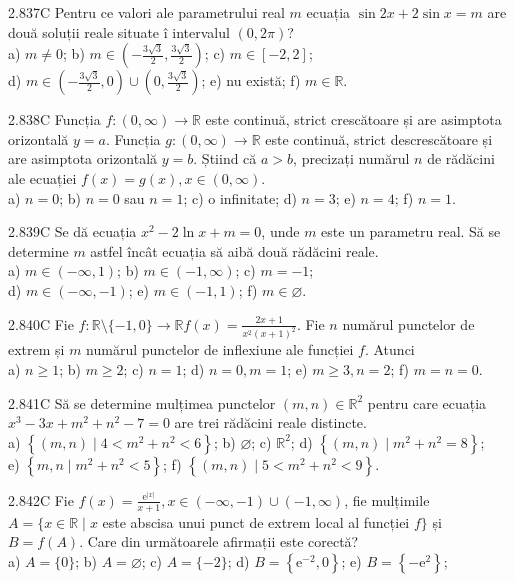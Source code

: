 \documentclass[11pt]{article}
\begin{document}
2.837C Pentru ce valori ale parametrului real $m$ ecuația $\sin 2 x+2 \sin x=m$ are două soluții reale situate î intervalul $(0,2 \pi)$?\\ a) $m \neq 0$; b) $m \in\left(-\frac{3 \sqrt{3}}{2}, \frac{3 \sqrt{3}}{2}\right)$; c) $m \in[-2,2]$;\\ d) $m \in\left(-\frac{3 \sqrt{3}}{2}, 0\right) \cup\left(0, \frac{3 \sqrt{3}}{2}\right)$; e) nu există; f) $m \in \mathbb{R}$.

2.838C Funcția $f:(0, \infty) \rightarrow \mathbb{R}$ este continuă, strict crescătoare și are asimptota orizontală $y=a$. Funcția $g:(0, \infty) \rightarrow \mathbb{R}$ este continuă, strict descrescătoare și are asimptota orizontală $y=b$. Știind că $a>b$, precizați numărul $n$ de rădăcini ale ecuației $f(x)=g(x), x \in(0, \infty)$.\\ a) $n=0$; b) $n=0$ sau $n=1$; c) o infinitate; d) $n=3$; e) $n=4$; f) $n=1$.

2.839C Se dă ecuația $x^{2}-2 \ln x+m=0$, unde $m$ este un parametru real. Să se determine $m$ astfel încât ecuația să aibă două rădăcini reale.\\ a) $m \in(-\infty, 1)$; b) $m \in(-1, \infty)$; c) $m=-1$;\\ d) $m \in(-\infty,-1)$; e) $m \in(-1,1)$; f) $m \in \varnothing$.

2.840C Fie $f: \mathbb{R} \setminus\{-1,0\} \rightarrow \mathbb{R} f(x)=\frac{2 x+1}{x^{2}(x+1)^{2}}$. Fie $n$ numărul punctelor de extrem și $m$ numărul punctelor de inflexiune ale funcției $f$. Atunci\\ a) $n \geq 1$; b) $m \geq 2$; c) $n=1$; d) $n=0, m=1$; e) $m \geq 3, n=2$; f) $m=n=0$.

2.841C Să se determine mulțimea punctelor $(m, n) \in \mathbb{R}^{2}$ pentru care ecuația $x^{3}-3 x+m^{2}+n^{2}-7=0$ are trei rădăcini reale distincte.\\ a) $\left\{(m, n) \mid 4<m^{2}+n^{2}<6\right\}$; b) $\varnothing$; c) $\mathbb{R}^{2}$; d) $\left\{(m, n) \mid m^{2}+n^{2}=8\right\}$;\\ e) $\left\{m, n \mid m^{2}+n^{2}<5\right\}$; f) $\left\{(m, n) \mid 5<m^{2}+n^{2}<9\right\}$.

2.842C Fie $f(x)=\frac{\mathrm{e}^{|x|}}{x+1}, x \in(-\infty,-1) \cup(-1, \infty)$, fie mulțimile $A=\{x \in \mathbb{R} \mid x$ este abscisa unui punct de extrem local al funcției $f\}$ și $B=f(A)$. Care din următoarele afirmații este corectă?\\ a) $A=\{0\}$; b) $A=\varnothing$; c) $A=\{-2\}$; d) $B=\left\{\mathrm{e}^{-2}, 0\right\}$; e) $B=\left\{-\mathrm{e}^{2}\right\}$;
\end{document}
